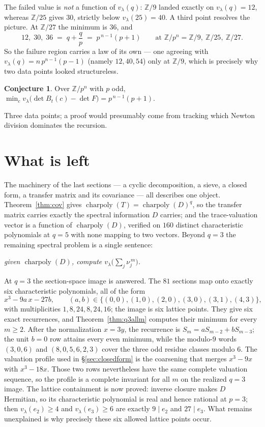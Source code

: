 \documentclass[11pt]{article}
\theoremstyle{plain}
\theoremstyle{definition}
\newtheorem{conjecture}[theorem]{Conjecture}
\newcommand{\ZZ}{\mathbb Z}
\newcommand{\vlam}{v_\lambda}
\begin{document}
The failed value is \emph{not} a function of $\vlam(q)$: $\ZZ/9$ landed exactly
on $\vlam(q)=12$, whereas $\ZZ/25$ gives $30$, strictly below $\vlam(25)=40$.
A third point resolves the picture. At $\ZZ/27$ the minimum is $36$, and
\[
12,\;30,\;36 \;=\; q+\frac{q}{p} \;=\; p^{\,n-1}(p+1)
\qquad\text{at }\ZZ/p^{n}=\ZZ/9,\ \ZZ/25,\ \ZZ/27 .
\]
So the failure region carries a law of its own --- one agreeing with
$\vlam(q)=n\,p^{n-1}(p-1)$ (namely $12,40,54$) only at $\ZZ/9$, which is
precisely why two data points looked structureless.

\begin{conjecture}
Over $\ZZ/p^{n}$ with $p$ odd, $\min_c\vlam\bigl(\det B_t(c)-\det F\bigr)
=p^{\,n-1}(p+1)$.
\end{conjecture}

\noindent Three data points; a proof would presumably come from tracking which
Newton division dominates the recursion.

\section{What is left}\label{sec:closing}

The machinery of the last sections --- a cyclic decomposition, a sieve, a
closed form, a transfer matrix and its covariance --- all describes one object.
Theorem~\ref{thm:cov} gives $\operatorname{charpoly}(T)=\operatorname{charpoly}
(D)^q$, so the transfer matrix carries exactly the spectral information $D$
carries; and the trace-valuation vector is a function of
$\operatorname{charpoly}(D)$, verified on $160$ distinct characteristic
polynomials at $q=5$ with none mapping to two vectors. Beyond $q=3$ the
remaining spectral problem is a single sentence:

\begin{center}
\emph{given $\operatorname{charpoly}(D)$, compute
$\vlam\bigl(\sum_j \nu_j^{\,m}\bigr)$.}
\end{center}

At $q=3$ the section-space image is answered. The $81$ sections map onto exactly six characteristic
polynomials, all of the form
\[
x^3-9a\,x-27b,\qquad
(a,b)\in\{(0,0),(1,0),(2,0),(3,0),(3,1),(4,3)\},
\]
with multiplicities $1,8,24,8,24,16$; the image is six lattice points. They
give six exact recurrences, and Theorem~\ref{thm:q3allm} computes their minimum
for every $m\ge2$. After the normalization $x=3y$, the recurrence is
$S_m=aS_{m-2}+bS_{m-3}$; the unit $b=0$ row attains every even minimum, while
the modulo-$9$ words $(3,0,6)$ and $(8,0,5,6,2,3)$ cover the three odd residue
classes modulo $6$. The valuation profile used in
\S\ref{sec:closedform} is the coarsening that merges $x^3-9x$ with $x^3-18x$.
Those two rows nevertheless have the same complete valuation sequence, so the
profile is a complete invariant for all $m$ on the realized $q=3$ image.
The lattice containment is now proved: inverse closure makes $D$ Hermitian,
so its characteristic polynomial is real and hence rational at $p=3$; then
$\vlam(e_2)\ge4$ and $\vlam(e_3)\ge6$ are exactly $9\mid e_2$ and
$27\mid e_3$.  What remains unexplained is why precisely these six allowed
lattice points occur.
\end{document}
